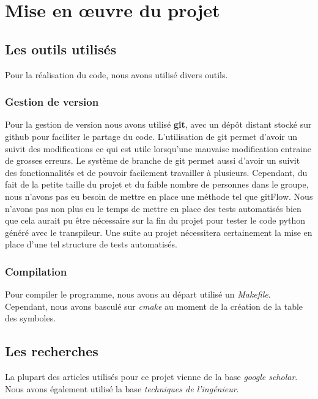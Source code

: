 \documentclass[a4paper]{article}%
\begin{document}
\section{Mise en œuvre du projet}

\subsection{Les outils utilisés}

Pour la réalisation du code, nous avons utilisé divers outils.

\subsubsection{Gestion de version}

Pour la gestion de version nous avons utilisé \textbf{git}, avec un dépôt
distant stocké sur github pour faciliter le partage du code. L'utilisation de
git permet d'avoir un suivit des modifications ce qui est utile lorsqu'une
mauvaise modification entraine de grosses erreurs. Le système de branche de git
permet aussi d'avoir un suivit des fonctionnalités et de pouvoir facilement
travailler à plusieurs. Cependant, du fait de la petite taille du projet et du
faible nombre de personnes dans le groupe, nous n'avons pas eu besoin de mettre
en place une méthode tel que gitFlow. Nous n'avons pas non plus eu le temps de
mettre en place des tests automatisés bien que cela aurait pu être nécessaire
sur la fin du projet pour tester le code python généré avec le transpileur. Une
suite au projet nécessitera certainement la mise en place d'une tel structure de
tests automatisés.\\

\subsubsection{Compilation}

Pour compiler le programme, nous avons au départ utilisé un \textit{Makefile}.
Cependant, nous avons basculé sur \textit{cmake} au moment de la création de la
table des symboles.

\subsection{Les recherches} %

La plupart des articles utilisés pour ce projet vienne de la base \textit{google
scholar}. Nous avons également utilisé la base \textit{techniques de
l'ingénieur}.
\end{document}
